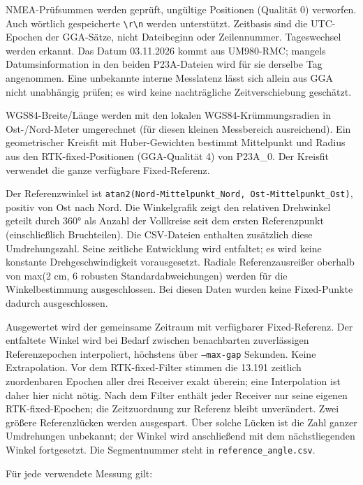 \documentclass[11pt,a4paper]{article}
\numberwithin{equation}{section}
\numberwithin{figure}{section}
\begin{document}
NMEA-Prüfsummen werden geprüft, ungültige Positionen (Qualität 0) verworfen. Auch wörtlich gespeicherte {\small\texttt{\textbackslash{}r\textbackslash{}n}} werden unterstützt. Zeitbasis sind die UTC-Epochen der GGA-Sätze, nicht Dateibeginn oder Zeilennummer. Tageswechsel werden erkannt. Das Datum 03.11.2026 kommt aus UM980-RMC; mangels Datumsinformation in den beiden P23A-Dateien wird für sie derselbe Tag angenommen. Eine unbekannte interne Messlatenz lässt sich allein aus GGA nicht unabhängig prüfen; es wird keine nachträgliche Zeitverschiebung geschätzt.

WGS84-Breite/\allowbreak{}Länge werden mit den lokalen WGS84-Krümmungsradien in Ost-/\allowbreak{}Nord-Meter umgerechnet (für diesen kleinen Messbereich ausreichend). Ein geometrischer Kreisfit mit Huber-Gewichten bestimmt Mittelpunkt und Radius aus den RTK-fixed-Positionen (GGA-Qualität 4) von P23A\_0. Der Kreisfit verwendet die ganze verfügbare Fixed-Referenz.

Der Referenzwinkel ist {\small\texttt{atan2(Nord-Mittelpunkt\_\allowbreak{}Nord, Ost-Mittelpunkt\_\allowbreak{}Ost)}}, positiv von Ost nach Nord. Die Winkelgrafik zeigt den relativen Drehwinkel geteilt durch 360° als Anzahl der Vollkreise seit dem ersten Referenzpunkt (einschließlich Bruchteilen). Die CSV-Dateien enthalten zusätzlich diese Umdrehungszahl. Seine zeitliche Entwicklung wird entfaltet; es wird keine konstante Drehgeschwindigkeit vorausgesetzt. Radiale Referenzausreißer oberhalb von max(2 cm, 6 robusten Standardabweichungen) werden für die Winkelbestimmung ausgeschlossen. Bei diesen Daten wurden keine Fixed-Punkte dadurch ausgeschlossen.

Ausgewertet wird der gemeinsame Zeitraum mit verfügbarer Fixed-Referenz. Der entfaltete Winkel wird bei Bedarf zwischen benachbarten zuverlässigen Referenzepochen interpoliert, höchstens über {\small\texttt{--max-gap}} Sekunden. Keine Extrapolation. Vor dem RTK-fixed-Filter stimmen die 13.191 zeitlich zuordenbaren Epochen aller drei Receiver exakt überein; eine Interpolation ist daher hier nicht nötig. Nach dem Filter enthält jeder Receiver nur seine eigenen RTK-fixed-Epochen; die Zeitzuordnung zur Referenz bleibt unverändert. Zwei größere Referenzlücken werden ausgespart. Über solche Lücken ist die Zahl ganzer Umdrehungen unbekannt; der Winkel wird anschließend mit dem nächstliegenden Winkel fortgesetzt. Die Segmentnummer steht in {\small\texttt{reference\_\allowbreak{}angle.csv}}.

Für jede verwendete Messung gilt:
\end{document}
